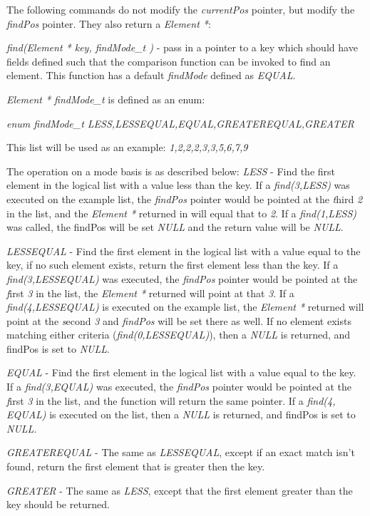 \documentclass[11pt]{report}
\begin{document}
The following commands do not modify the {\it currentPos} pointer, but
modify the {\it findPos} pointer.  They also return a {\it Element *}:

{\it find(Element * key, findMode\_t )} - pass in a pointer to a key
which should have fields defined such that the comparison function can
be invoked to find an element.  This function has a default
{\it findMode} defined as {\it EQUAL}.

{\it Element * findMode\_t} is defined as an enum:

{\it enum findMode\_t {LESS,LESSEQUAL,EQUAL,GREATEREQUAL,GREATER}}

This list will be used as an example:
{\it 1,2,2,2,3,3,5,6,7,9}

The operation on a mode basis is as described below: {\it LESS} - Find
the first element in the logical list with a value less than the key.
If a {\it find(3,LESS)} was executed on the example list, the
{\it findPos} pointer would be pointed at the {\emph third} {\it 2}
in the list, and the {\it Element *} returned in will equal that to
{\it 2}.  If a {\it find(1,LESS)} was called, the findPos will be set
{\it NULL} and the return value will be {\it NULL}.

{\it LESSEQUAL} - Find the first element in the logical list with a
value equal to the key, if no such element exists, return the first
element less than the key. If a {\it find(3,LESSEQUAL)} was executed,
the {\it findPos} pointer would be pointed at the {\emph first}
{\it 3} in the list, the {\it Element *} returned will point at that
{\it 3}.  If a {\it find(4,LESSEQUAL)} is executed on the example
list, the {\it Element *} returned will point at the {\emph second}
{\it 3} and {\it findPos} will be set there as well.  If no element
exists matching either criteria ({\it find(0,LESSEQUAL)}), then a
{\it NULL} is returned, and findPos is set to {\it NULL}.

{\it EQUAL} - Find the first element in the logical list with a value
equal to the key.  If a {\it find(3,EQUAL)} was executed, the
{\it findPos} pointer would be pointed at the {\emph first} {\it 3}
in the list, and the function will return the same pointer.  If a
{\it find(4, EQUAL)} is executed on the list, then a {\it NULL} is
returned, and findPos is set to {\it NULL}.

{\it GREATEREQUAL} - The same as {\it LESSEQUAL}, except if an exact match
isn't found, return the first element that is greater then the key.

{\it GREATER} - The same as {\it LESS}, except that the first element
greater than the key should be returned.
\end{document}
